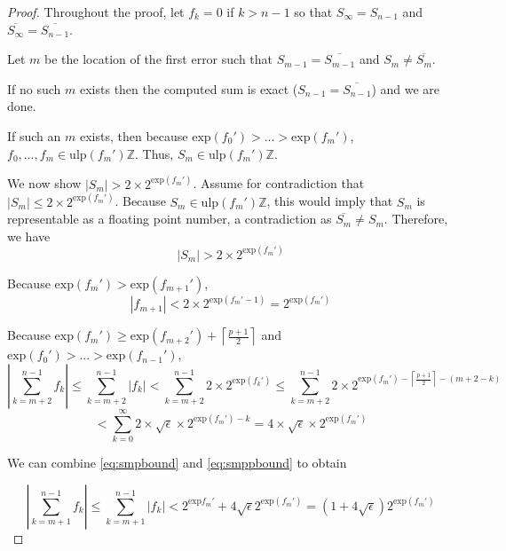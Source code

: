 \documentclass[12pt]{article}
\providecommand{\ceil}[1]{\left \lceil #1 \right \rceil }
\providecommand{\Z}{\ensuremath{\mathbb{Z}}}
\providecommand{\exp}{\ensuremath{\text{exp}}}
\providecommand{\ulp}{\ensuremath{\text{ulp}}}
\theoremstyle{definition}
\numberwithin{equation}{section}
\numberwithin{figure}{section}
\begin{document}
    \begin{proof}

      Throughout the proof, let $f_k = 0$ if $k > n - 1$ so that $S_{\infty} = S_{n - 1}$ and $\overline{S_{\infty}} = \overline{S_{n - 1}}$.

      Let $m$ be the location of the first error such that $S_{m - 1} = \overline{S_{m - 1}}$ and $S_{m} \neq \overline{S_{m}}$.

      If no such $m$ exists then the computed sum is exact ($S_{n - 1} = \overline{S_{n - 1}}$) and we are done.

      If such an $m$ exists, then because $\exp(f_0') > ... > \exp(f_m')$, $f_0, ..., f_m \in \ulp(f_m')\Z$. Thus, $S_m \in \ulp(f_m')\Z$.

      We now show $|S_m| > 2 \times 2^{\exp(f_m')}$. Assume for contradiction that $|S_m| \leq 2 \times 2^{\exp(f_m')}$. Because $S_m \in \ulp(f_m')\Z$, this would imply that $S_m$ is representable as a floating point number, a contradiction as $\overline{S_m} \neq S_m$. Therefore, we have
      \begin{equation}
        |S_m| > 2 \times 2^{\exp(f_m')}
        \label{eq:smbound}
      \end{equation}

      Because $\exp(f_m') > \exp(f_{m + 1}')$,
      \begin{equation}
        |f_{m + 1}| < 2\times2^{\exp(f_m' - 1)} = 2^{\exp(f_m')}
        \label{eq:smpbound}
      \end{equation}

      Because $\exp(f_m') \geq \exp(f_{m + 2}') + \ceil{\frac{p + 1}{2}}$ and $\exp(f_0') > ... > \exp(f_{n - 1}')$,
      \begin{equation*}
        |\sum \limits_{k = m + 2}^{n - 1} f_k| \leq \sum \limits_{k = m + 2}^{n - 1} |f_k| < \sum \limits_{k = m + 2}^{n - 1} 2 \times 2^{\exp(f_k')} \leq \sum \limits_{k = m + 2}^{n - 1} 2 \times 2^{\exp(f_m') - \ceil{\frac{p + 1}{2}} - (m + 2 - k)}
      \end{equation*}
      \begin{equation}
        < \sum \limits_{k = 0}^{\infty} 2 \times \sqrt{\epsilon} \times 2^{\exp(f_m') - k} = 4 \times \sqrt\epsilon \times 2^{\exp(f_m')}
        \label{eq:smppbound}
      \end{equation}

      We can combine  \eqref{eq:smpbound} and \eqref{eq:smppbound} to obtain

      \begin{equation}
        |\sum\limits_{k = m + 1}^{n - 1} f_k| \leq \sum\limits_{k = m + 1}^{n - 1} |f_k| < 2^{\exp{f_m'}} + 4 \sqrt{\epsilon} 2^{\exp(f_m')} = (1 + 4 \sqrt\epsilon )2^{\exp(f_m')}
        \label{eq:smsbound}
      \end{equation}


\end{proof}
\end{document}
